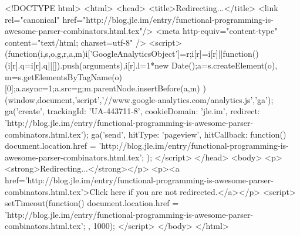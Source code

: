 <!DOCTYPE html>
<html>
<head>
<title>Redirecting...</title>
<link rel="canonical" href="http://blog.jle.im/entry/functional-programming-is-awesome-parser-combinators.html.tex"/>
<meta http-equiv="content-type" content="text/html; charset=utf-8" />
<script>
(function(i,s,o,g,r,a,m){i['GoogleAnalyticsObject']=r;i[r]=i[r]||function(){
(i[r].q=i[r].q||[]).push(arguments)},i[r].l=1*new Date();a=s.createElement(o),
m=s.getElementsByTagName(o)[0];a.async=1;a.src=g;m.parentNode.insertBefore(a,m)
})(window,document,'script','//www.google-analytics.com/analytics.js','ga');
ga('create', { trackingId: 'UA-443711-8', cookieDomain: 'jle.im', redirect: 'http://blog.jle.im/entry/functional-programming-is-awesome-parser-combinators.html.tex'});
ga('send', { hitType: 'pageview', hitCallback: function() { document.location.href = 'http://blog.jle.im/entry/functional-programming-is-awesome-parser-combinators.html.tex'; } });
</script>
</head>
<body>
  <p><strong>Redirecting...</strong></p>
  <p><a href='http://blog.jle.im/entry/functional-programming-is-awesome-parser-combinators.html.tex'>Click here if you are not redirected.</a></p>
  <script>
    setTimeout(function() { document.location.href = 'http://blog.jle.im/entry/functional-programming-is-awesome-parser-combinators.html.tex'; }, 1000);
  </script>
</body>
</html>
